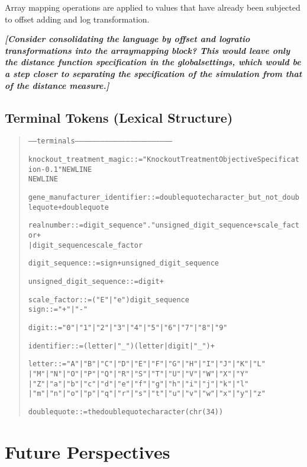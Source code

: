 \documentclass[a4paper,fleqn]{article}
\newcommand{\todo}[1]{\rule{0pt}{0pt}\marginpar{\rule{1ex}{1ex}}\textbf{\emph{[#1]}}}
\newenvironment{ebnfrule}{\begin{footnotesize}\begin{quote}\begin{alltt}}{\end{alltt}\end{quote}\end{footnotesize}}
\begin{document}
Array mapping operations are applied to values that have already been
subjected to offset adding and log transformation.

\todo{Consider consolidating the language by offset and logratio
  transformations into the arraymapping block? This would leave only
  the distance function specification in the globalsettings, which
  would be a step closer to separating the specification of the
  simulation from that of the distance measure.}
\cite{Parkinson2009}

\subsection{Terminal Tokens (Lexical Structure)}

\begin{ebnfrule}
----- terminals --------------------------------------------------------------------

knockout_treatment_magic ::= "KnockoutTreatmentObjectiveSpecification-0.1" NEWLINE
NEWLINE

gene_manufacturer_identifier ::= doublequote character_but_not_doublequote+ doublequote

realnumber ::= digit_sequence "." unsigned_digit_sequence+ scale_factor+
                | digit_sequence scale_factor

digit_sequence ::= sign+ unsigned_digit_sequence

unsigned_digit_sequence ::= digit+


scale_factor ::= ("E" | "e") digit_sequence
sign ::=  "+" | "-"


digit ::= "0" | "1" | "2" | "3" | "4" | "5" | "6" | "7" | "8" | "9"

identifier ::= (letter | "_") (letter | digit | "_")+

letter ::= "A" | "B" | "C" | "D" | "E" | "F" | "G" | "H" | "I" | "J" | "K"| "L" 
| "M" | "N" | "O" | "P" | "Q" | "R" | "S" | "T" | "U" | "V" | "W"| "X" | "Y" 
| "Z"| "a" | "b" | "c" | "d" | "e" | "f" | "g" | "h" | "i" | "j" | "k"| "l" 
| "m" | "n" | "o" | "p" | "q" | "r" | "s" | "t" | "u" | "v" | "w" | "x" | "y" | "z"

doublequote ::= the doublequote character (chr(34))
\end{ebnfrule}




\section{Future Perspectives}
\end{document}
